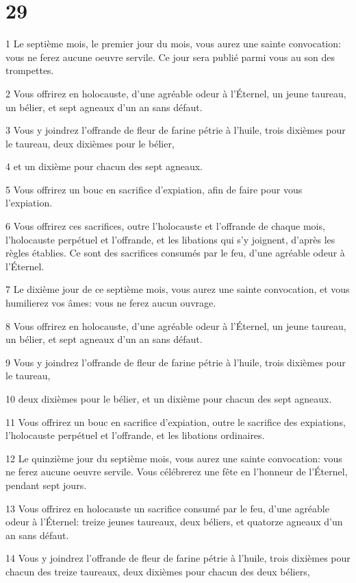 \chapter{29}

\par 1 Le septième mois, le premier jour du mois, vous aurez une sainte convocation: vous ne ferez aucune oeuvre servile. Ce jour sera publié parmi vous au son des trompettes.
\par 2 Vous offrirez en holocauste, d'une agréable odeur à l'Éternel, un jeune taureau, un bélier, et sept agneaux d'un an sans défaut.
\par 3 Vous y joindrez l'offrande de fleur de farine pétrie à l'huile, trois dixièmes pour le taureau, deux dixièmes pour le bélier,
\par 4 et un dixième pour chacun des sept agneaux.
\par 5 Vous offrirez un bouc en sacrifice d'expiation, afin de faire pour vous l'expiation.
\par 6 Vous offrirez ces sacrifices, outre l'holocauste et l'offrande de chaque mois, l'holocauste perpétuel et l'offrande, et les libations qui s'y joignent, d'après les règles établies. Ce sont des sacrifices consumés par le feu, d'une agréable odeur à l'Éternel.
\par 7 Le dixième jour de ce septième mois, vous aurez une sainte convocation, et vous humilierez vos âmes: vous ne ferez aucun ouvrage.
\par 8 Vous offrirez en holocauste, d'une agréable odeur à l'Éternel, un jeune taureau, un bélier, et sept agneaux d'un an sans défaut.
\par 9 Vous y joindrez l'offrande de fleur de farine pétrie à l'huile, trois dixièmes pour le taureau,
\par 10 deux dixièmes pour le bélier, et un dixième pour chacun des sept agneaux.
\par 11 Vous offrirez un bouc en sacrifice d'expiation, outre le sacrifice des expiations, l'holocauste perpétuel et l'offrande, et les libations ordinaires.
\par 12 Le quinzième jour du septième mois, vous aurez une sainte convocation: vous ne ferez aucune oeuvre servile. Vous célébrerez une fête en l'honneur de l'Éternel, pendant sept jours.
\par 13 Vous offrirez en holocauste un sacrifice consumé par le feu, d'une agréable odeur à l'Éternel: treize jeunes taureaux, deux béliers, et quatorze agneaux d'un an sans défaut.
\par 14 Vous y joindrez l'offrande de fleur de farine pétrie à l'huile, trois dixièmes pour chacun des treize taureaux, deux dixièmes pour chacun des deux béliers,
